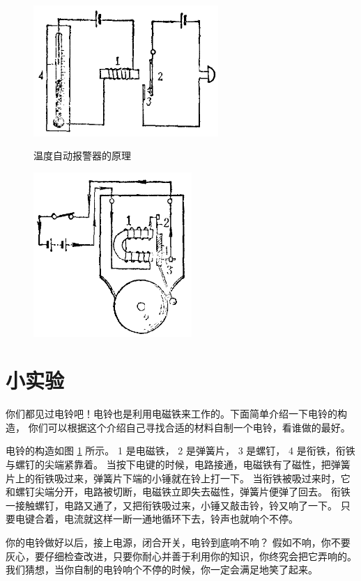 \begin{figure}[htbp]
    \centering
    \begin{minipage}{7cm}
    \centering
    \includegraphics[width=7cm]{../pic/czwl2-ch10-35}
    \caption{温度自动报警器的原理}\label{fig:10-35}
    \end{minipage}
    \qquad
    \begin{minipage}{7cm}
    \centering
    \includegraphics[width=6cm]{../pic/czwl2-ch10-36}
    \caption{}\label{fig:10-36}
    \end{minipage}
\end{figure}

\section*{小实验}

你们都见过电铃吧！电铃也是利用电磁铁来工作的。下面简单介绍一下电铃的构造，
你们可以根据这个介绍自己寻找合适的材料自制一个电铃，看谁做的最好。

电铃的构造如图 \ref{fig:10-36} 所示。
1 是电磁铁， 2 是弹簧片， 3 是螺钉， 4 是衔铁，衔铁与螺钉的尖端紧靠着。
当按下电键的时候，电路接通，电磁铁有了磁性，把弹簧片上的衔铁吸过来，弹簧片下端的小锤就在铃上打一下。
当衔铁被吸过来时，它和螺钉尖端分开，电路被切断，电磁铁立即失去磁性，弹簧片便弹了回去。
衔铁一接触螺钉，电路又通了，又把衔铁吸过来，小锤又敲击铃，铃又响了一下。
只要电键合着，电流就这样一断一通地循环下去，铃声也就响个不停。

你的电铃做好以后，接上电源，闭合开关，电铃到底响不响？
假如不响，你不要灰心，要仔细检查改进，只要你耐心并善于利用你的知识，你终究会把它弄响的。
我们猜想，当你自制的电铃响个不停的时候，你一定会满足地笑了起来。

